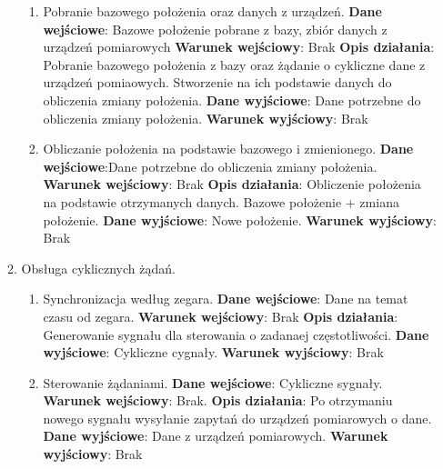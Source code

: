 \documentclass[11pt]{article}
\begin{document}
\begin{enumerate}
\begin{enumerate}[label*=\arabic*.]
\begin{enumerate}[label*=\arabic*.]
				\item Pobranie bazowego położenia oraz danych z urządzeń. \newline
				\textbf{Dane wejściowe}: Bazowe położenie pobrane z bazy, zbiór danych z urządzeń pomiarowych	\newline
				\textbf{Warunek wejściowy}: Brak		\newline   	
				\textbf{Opis działania}: Pobranie bazowego położenia z bazy oraz żądanie o cykliczne dane z urządzeń pomiaowych. Stworzenie na ich podstawie danych do obliczenia zmiany położenia.	\newline
				\textbf{Dane wyjściowe}: Dane potrzebne do obliczenia zmiany położenia.	\newline
				\textbf{Warunek wyjściowy}: Brak
				\item Obliczanie położenia na podstawie bazowego i zmienionego. \newline
				\textbf{Dane wejściowe}:Dane potrzebne do obliczenia zmiany położenia.	\newline
				\textbf{Warunek wejściowy}: Brak		\newline   	
				\textbf{Opis działania}: Obliczenie położenia na podstawie otrzymanych danych. Bazowe położenie + zmiana położenie.	\newline
				\textbf{Dane wyjściowe}: Nowe położenie.	\newline
				\textbf{Warunek wyjściowy}: Brak
			\end{enumerate}
			\item Obsługa cyklicznych żądań.
			\begin{enumerate}[label*=\arabic*.]
				\item Synchronizacja według zegara. \newline
				\textbf{Dane wejściowe}: Dane na temat czasu od zegara.	\newline
				\textbf{Warunek wejściowy}:  Brak		\newline   	
				\textbf{Opis działania}: Generowanie sygnału dla sterowania o zadanaej częstotliwości.	\newline
				\textbf{Dane wyjściowe}: Cykliczne cygnały.	\newline
				\textbf{Warunek wyjściowy}: Brak
				\item Sterowanie żądaniami. \newline
				\textbf{Dane wejściowe}: Cykliczne sygnały.	\newline
				\textbf{Warunek wejściowy}: Brak.		\newline   	
				\textbf{Opis działania}: Po otrzymaniu nowego sygnału wysyłanie zapytań do urządzeń pomiarowych o dane.	\newline
				\textbf{Dane wyjściowe}: Dane z urządzeń pomiarowych.	\newline
				\textbf{Warunek wyjściowy}: Brak
			\end{enumerate}
		\end{enumerate}
	\end{enumerate}
\end{document}
